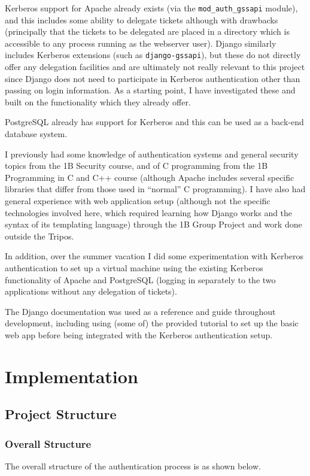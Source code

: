 \documentclass[12pt]{report}
\begin{document}
Kerberos support for Apache already exists (via the \verb+mod_auth_gssapi+ module), and this includes some ability to delegate tickets although with drawbacks (principally that the tickets to be delegated are placed in a directory which is accessible to any process running as the webserver user). Django similarly includes Kerberos extensions (such as \verb+django-gssapi+), but these do not directly offer any delegation facilities and are ultimately not really relevant to this project since Django does not need to participate in Kerberos authentication other than passing on login information. As a starting point, I have investigated these and built on the functionality which they already offer.

PostgreSQL already has support for Kerberos and this can be used as a back-end database system.

I previously had some knowledge of authentication systems and general security topics from the 1B Security course, and of C programming from the 1B Programming in C and C++ course (although Apache includes several specific libraries that differ from those used in ``normal'' C programming\cite{Apache-book}). I have also had general experience with web application setup (although not the specific technologies involved here, which required learning how Django works and the syntax of its templating language) through the 1B Group Project and work done outside the Tripos.

In addition, over the summer vacation I did some experimentation with Kerberos authentication to set up a virtual machine using the existing Kerberos functionality of Apache and PostgreSQL (logging in separately to the two applications without any delegation of tickets).

The Django documentation\cite{Django-docs} was used as a reference and guide throughout development, including using (some of) the provided tutorial to set up the basic web app before being integrated with the Kerberos authentication setup.


\chapter{Implementation}

\section{Project Structure}

\subsection{Overall Structure}
The overall structure of the authentication process is as shown below.
\end{document}
